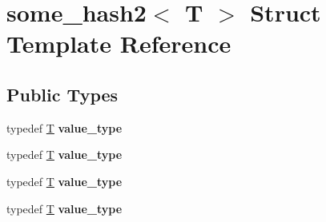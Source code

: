 \hypertarget{structsome__hash2}{}\section{some\+\_\+hash2$<$ T $>$ Struct Template Reference}
\label{structsome__hash2}
\subsection*{Public Types}
\begin{DoxyCompactItemize}
\item 
\mbox{\label{structsome__hash2_a428ffbc385ef52d9643c4b835f9d40db}} 
typedef \mbox{\hyperlink{struct_t}{T}} {\bfseries value\+\_\+type}
\item 
\mbox{\label{structsome__hash2_a428ffbc385ef52d9643c4b835f9d40db}} 
typedef \mbox{\hyperlink{struct_t}{T}} {\bfseries value\+\_\+type}
\item 
\mbox{\label{structsome__hash2_a428ffbc385ef52d9643c4b835f9d40db}} 
typedef \mbox{\hyperlink{struct_t}{T}} {\bfseries value\+\_\+type}
\item 
\mbox{\label{structsome__hash2_a428ffbc385ef52d9643c4b835f9d40db}} 
typedef \mbox{\hyperlink{struct_t}{T}} {\bfseries value\+\_\+type}
\end{DoxyCompactItemize}
